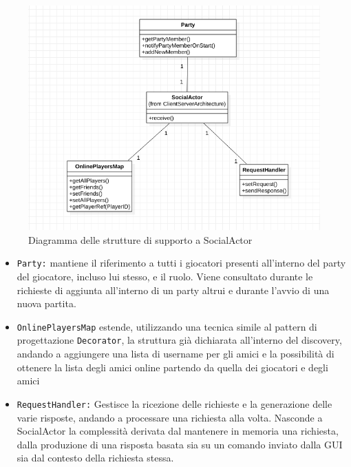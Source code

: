 \begin{figure}[H]
	\includegraphics[width=\textwidth,height=\textheight,keepaspectratio]{socialActor}
	\caption{Diagramma delle strutture di supporto a SocialActor}
\end{figure}

\begin{itemize}
	\item{\texttt{Party:}} mantiene il riferimento a tutti i giocatori presenti all'interno del party del giocatore, incluso lui stesso, e il ruolo. Viene consultato durante le richieste di aggiunta all'interno di un party altrui e durante l'avvio di una nuova partita.

	\item{\texttt{OnlinePlayersMap}} estende, utilizzando una tecnica simile al pattern di progettazione \texttt{Decorator}, la struttura già dichiarata all'interno del discovery, andando a aggiungere una lista di username per gli amici e la possibilità di ottenere la lista degli amici online partendo da quella dei giocatori e degli amici

	\item{\texttt{RequestHandler:}} Gestisce la ricezione delle richieste e la generazione delle varie risposte, andando a processare una richiesta alla volta. Nasconde a SocialActor la complessità derivata dal mantenere in memoria una richiesta, dalla produzione di una risposta basata sia su un comando inviato dalla GUI sia dal contesto della richiesta stessa.

\end{itemize}

